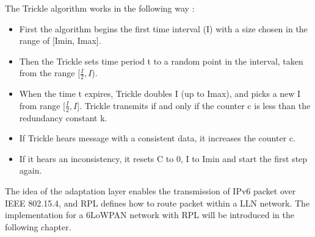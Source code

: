The Trickle algorithm works in the following way \cite{RFC 6206}:
\begin{itemize}
\item First the algorithm begins the first time interval (I) with a size chosen in the range of [Imin, Imax].
\newline

\item Then the Trickle sets time period t to a random point in the interval, taken from the range [$\frac{I}{2}, I$).  
\newline
 
\item When the time t expires, Trickle doubles I (up to Imax), and picks a new I from range [$\frac{I}{2}, I$].  Trickle transmits if and only if the counter c is less than the redundancy constant k.
\newline

\item If Trickle hears message with a consistent data, it increases the counter c.
\newline

\item If it hears an inconsistency, it resets C to 0, I to Imin and start the first step again.
\newline

\end{itemize}

The idea of the adaptation layer enables the transmission of IPv6 packet over IEEE 802.15.4, and RPL defines how to route packet within a LLN network. The implementation for a 6LoWPAN network with RPL will be introduced in the following chapter.






 









